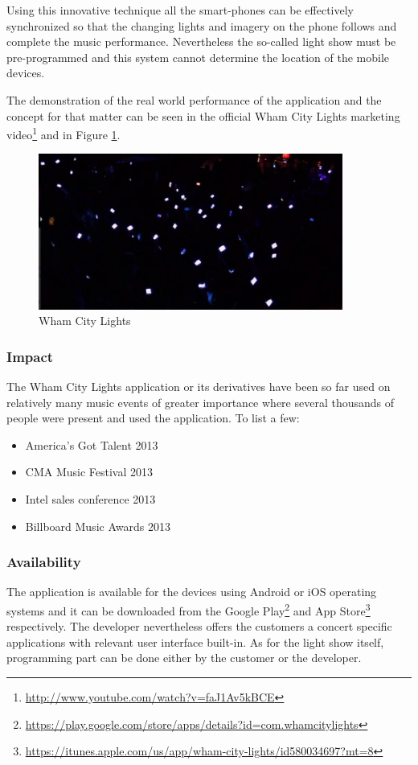 Using this innovative technique all the smart-phones can be effectively synchronized so that the  changing lights and imagery on the phone follows and complete the music performance.
Nevertheless the so-called light show must be pre-programmed and this system cannot determine the location of the mobile devices.

The demonstration of the real world performance of the application and the concept for that matter can be seen in the official Wham City Lights marketing video\footnote{\url{http://www.youtube.com/watch?v=faJ1Av5kBCE}} and in Figure \ref{fig:wham_city_lights}.

\begin{figure}[!ht]
	\centering
		\includegraphics[width=10cm]{preliminaryStudies/wham_city_lights.jpg}
	\caption{Wham City Lights}
	\label{fig:wham_city_lights}
\end{figure}

\subsubsection{Impact}
The Wham City Lights application or its derivatives have been so far used on relatively many music events of greater importance where several thousands of people were present and used the application. To list a few:
\begin{itemize}
\item America's Got Talent 2013
\item CMA Music Festival 2013
\item Intel sales conference 2013
\item Billboard Music Awards 2013
\end{itemize}

\subsubsection{Availability}
The application is available for the devices using Android or iOS operating systems and it can be downloaded from the Google Play\footnote{\url{https://play.google.com/store/apps/details?id=com.whamcitylights}} and App Store\footnote{\url{https://itunes.apple.com/us/app/wham-city-lights/id580034697?mt=8}} respectively. The developer nevertheless offers the customers a concert specific applications with relevant user interface built-in. As for the light show itself, programming part can be done either by the customer or the developer.

